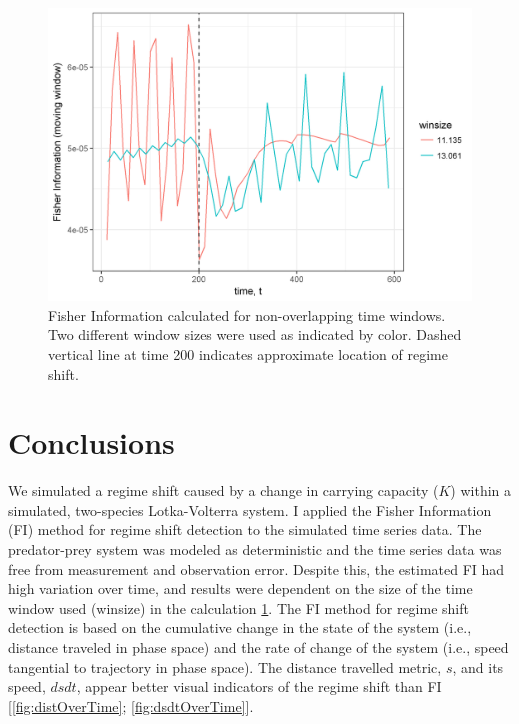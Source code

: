 \documentclass[12pt,twoside,openany]{reedthesis}
\begin{document}
\begin{figure}
\includegraphics[width=0.85\linewidth]{./chapterFiles/fiGuide/figures/fiOverTime} \caption{Fisher Information calculated for non-overlapping time windows. Two different window sizes were used as indicated by color. Dashed vertical line at time 200 indicates approximate location of regime shift.}\label{fig:fiOverTime}
\end{figure}
\section{Conclusions}\label{conclusions}

We simulated a regime shift caused by a change in carrying capacity
(\(K\)) within a simulated, two-species Lotka-Volterra system. I applied
the Fisher Information (FI) method for regime shift detection to the
simulated time series data. The predator-prey system was modeled as
deterministic and the time series data was free from measurement and
observation error. Despite this, the estimated FI had high variation
over time, and results were dependent on the size of the time window
used (winsize) in the calculation \ref{fig:fiOverTime}. The FI method
for regime shift detection is based on the cumulative change in the
state of the system (i.e., distance traveled in phase space) and the
rate of change of the system (i.e., speed tangential to trajectory in
phase space). The distance travelled metric, \(s\), and its speed,
\(dsdt\), appear better visual indicators of the regime shift than FI
{[}\ref{fig:distOverTime}; \ref{fig:dsdtOverTime}{]}.
\end{document}
